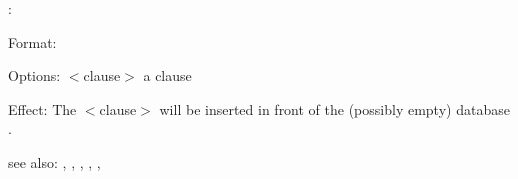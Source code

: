 \aNull:

Format: 

Options: $<$clause$>$ a \RELFUN{} clause

Effect: The $<$clause$>$ will be inserted in front of the
        (possibly empty) \RELFUN{} database .

see also: \az, \aNullhn, \aNullft, \consult, \destroy, \replace
